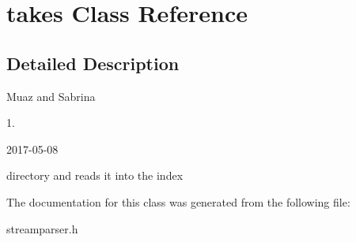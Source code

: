 \hypertarget{classtakes}{}\section{takes Class Reference}
\label{classtakes}


\subsection{Detailed Description}
Muaz and Sabrina

1.

2017-\/05-\/08

directory and reads it into the index 

The documentation for this class was generated from the following file\+:\begin{DoxyCompactItemize}
\item 
streamparser.\+h\end{DoxyCompactItemize}
